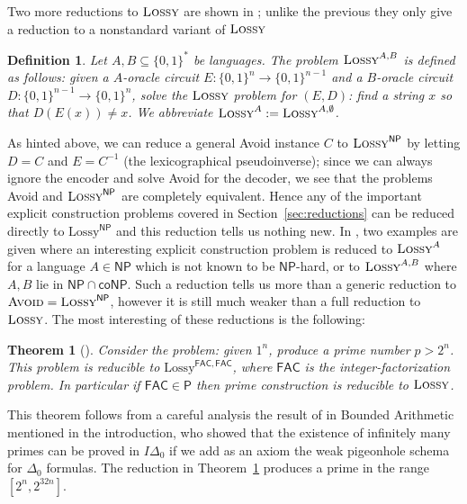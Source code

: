 \documentclass[11pt]{article}
\newtheorem{theorem}{Theorem}
\newtheorem{definition}{Definition}
\newcommand{\todo}[1]{\textcolor{red}{TODO: #1}}
\newcommand{\B}{\{0,1\}}
\newcommand{\avoid}{\textsc{Avoid}}
\newcommand{\lossy}{\textsc{Lossy}}
\begin{document}
Two more reductions to $\lossy$ are shown in \cite{Korten2}; unlike the previous they only give a reduction to a nonstandard variant of $\lossy$
\begin{definition}
Let $A,B \subseteq \B^*$ be languages. The problem $\lossy^{A,B}$ is defined as follows: given a $A$-oracle circuit $E: \B^{n} \to \B^{n-1}$ and a $B$-oracle circuit $D: \B^{n-1} \to \B^n$, solve the $\lossy$ problem for $(E,D)$: find a string $x$ so that $D(E(x)) \neq x$. We abbreviate $\lossy^A:=\lossy^{A,\emptyset}$.
\end{definition}
As hinted above, we can reduce a general Avoid instance $C$ to $\lossy^{\mathsf{NP}}$ by letting $D = C$ and $E = C^{-1}$ (the lexicographical pseudoinverse); since we can always ignore the encoder and solve Avoid for the decoder, we see that the problems Avoid and $\lossy^{\mathsf{NP}}$ are completely equivalent. Hence any of the important explicit construction problems covered in Section~\ref{sec:reductions} can be reduced directly to $\mathrm{Lossy}^{\mathsf{NP}}$ and this reduction tells us nothing new. In \cite{Korten2}, two examples are given where an interesting explicit construction problem is reduced to $\lossy^A$ for a language $A \in \mathsf{NP}$ which is not known to be $\mathsf{NP}$-hard, or to $\lossy^{A,B}$ where $A,B$ lie in $\mathsf{NP \cap coNP}$. Such a reduction tells us more than a generic reduction to $\avoid=\lossy^{\mathsf{NP}}$, however it is still much weaker than a full reduction to $\lossy$. The most interesting of these reductions is the following:
\begin{theorem}[\cite{Korten2}]\label{thm:lossy-primes}
Consider the problem: given $1^n$, produce a prime number $p > 2^n$. This problem is reducible to $\mathrm{Lossy}^{\mathsf{FAC}, \mathsf{FAC}}$, where $\mathsf{FAC}$ is the integer-factorization problem. In particular if $\mathsf{FAC} \in \mathsf{P}$ then prime construction is reducible to $\lossy$.
\end{theorem}
This theorem follows from a careful analysis the result of \cite{Paris-Wilkie-Woods} in Bounded Arithmetic mentioned in the introduction, who showed that the existence of infinitely many primes can be proved in $I\Delta_0$ if we add as an axiom the weak pigeonhole schema for $\Delta_0$ formulas. The reduction in Theorem~\ref{thm:lossy-primes} produces a prime in the range $[2^n, 2^{32 n}]$.
\end{document}
